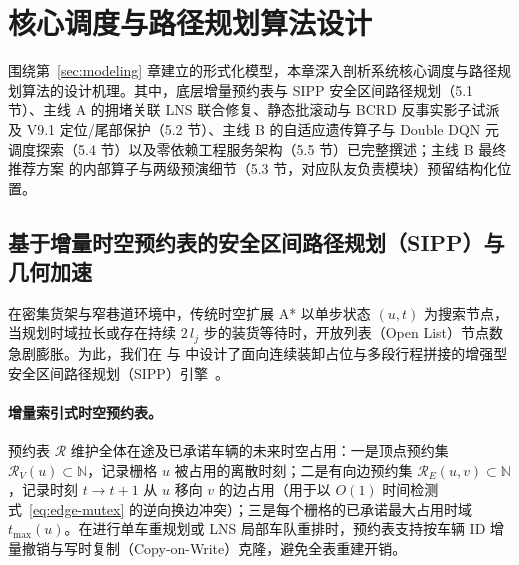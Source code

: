 \section{核心调度与路径规划算法设计}
\label{sec:algorithms}

围绕第~\ref{sec:modeling} 章建立的形式化模型，本章深入剖析系统核心调度与路径规划算法的设计机理。其中，底层增量预约表与 SIPP 安全区间路径规划（5.1 节）、主线 A 的拥堵关联 LNS 联合修复、静态批滚动与 BCRD 反事实影子试派及 V9.1 定位/尾部保护（5.2 节）、主线 B 的自适应遗传算子与 Double DQN 元调度探索（5.4 节）以及零依赖工程服务架构（5.5 节）已完整撰述；主线 B 最终推荐方案  的内部算子与两级预演细节（5.3 节，对应队友负责模块）预留结构化位置。

\subsection{基于增量时空预约表的安全区间路径规划（SIPP）与几何加速}

在密集货架与窄巷道环境中，传统时空扩展 A* 以单步状态 $(u, t)$ 为搜索节点，当规划时域拉长或存在持续 $2\,l_j$ 步的装货等待时，开放列表（Open List）节点数急剧膨胀。为此，我们在  与  中设计了面向连续装卸占位与多段行程拼接的增强型安全区间路径规划（SIPP）引擎~\cite{phillips2011sipp}。

\paragraph{增量索引式时空预约表。} 预约表 $\mathcal{R}$ 维护全体在途及已承诺车辆的未来时空占用：一是顶点预约集 $\mathcal{R}_V(u) \subset \mathbb{N}$，记录栅格 $u$ 被占用的离散时刻；二是有向边预约集 $\mathcal{R}_E(u, v) \subset \mathbb{N}$，记录时刻 $t \to t+1$ 从 $u$ 移向 $v$ 的边占用（用于以 $O(1)$ 时间检测式~\eqref{eq:edge-mutex} 的逆向换边冲突）；三是每个栅格的已承诺最大占用时域 $t_{\max}(u)$。在进行单车重规划或 LNS 局部车队重排时，预约表支持按车辆 ID 增量撤销与写时复制（Copy-on-Write）克隆，避免全表重建开销。

